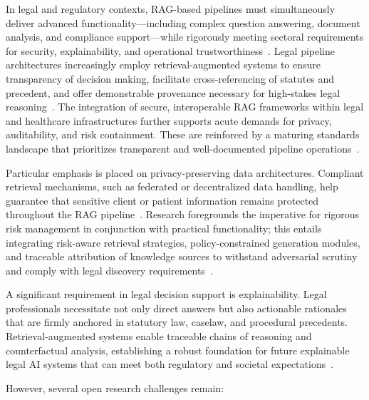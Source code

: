In legal and regulatory contexts, RAG-based pipelines must simultaneously deliver advanced functionality—including complex question answering, document analysis, and compliance support—while rigorously meeting sectoral requirements for security, explainability, and operational trustworthiness~\cite{ref63, ref64}. Legal pipeline architectures increasingly employ retrieval-augmented systems to ensure transparency of decision making, facilitate cross-referencing of statutes and precedent, and offer demonstrable provenance necessary for high-stakes legal reasoning~\cite{ref63}. The integration of secure, interoperable RAG frameworks within legal and healthcare infrastructures further supports acute demands for privacy, auditability, and risk containment. These are reinforced by a maturing standards landscape that prioritizes transparent and well-documented pipeline operations~\cite{ref63, ref64}.

Particular emphasis is placed on privacy-preserving data architectures. Compliant retrieval mechanisms, such as federated or decentralized data handling, help guarantee that sensitive client or patient information remains protected throughout the RAG pipeline~\cite{ref21, ref22, ref23, ref24, ref25, ref26, ref32, ref33, ref34, ref36, ref37, ref38, ref39, ref40, ref43, ref45, ref46, ref49, ref50, ref54, ref55, ref63}. Research foregrounds the imperative for rigorous risk management in conjunction with practical functionality; this entails integrating risk-aware retrieval strategies, policy-constrained generation modules, and traceable attribution of knowledge sources to withstand adversarial scrutiny and comply with legal discovery requirements~\cite{ref2, ref3, ref5, ref8, ref10, ref13, ref14, ref15, ref16, ref17, ref18, ref19, ref20, ref21, ref22, ref23, ref24, ref25, ref26, ref29, ref30, ref32, ref33, ref34, ref36, ref37, ref38, ref39, ref40, ref43, ref45, ref46, ref49, ref50, ref54, ref55, ref63}.

A significant requirement in legal decision support is explainability. Legal professionals necessitate not only direct answers but also actionable rationales that are firmly anchored in statutory law, caselaw, and procedural precedents. Retrieval-augmented systems enable traceable chains of reasoning and counterfactual analysis, establishing a robust foundation for future explainable legal AI systems that can meet both regulatory and societal expectations~\cite{ref63}.

However, several open research challenges remain:

